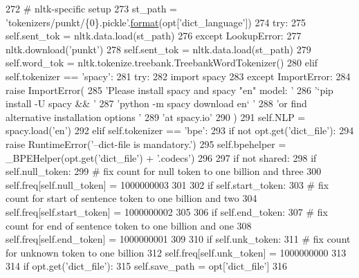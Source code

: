 \begin{DoxyCode}
272             \textcolor{comment}{# nltk-specific setup}
273             st\_path = \textcolor{stringliteral}{'tokenizers/punkt/\{0\}.pickle'}.\hyperlink{namespaceparlai_1_1chat__service_1_1services_1_1messenger_1_1shared__utils_a32e2e2022b824fbaf80c747160b52a76}{format}(opt[\textcolor{stringliteral}{'dict\_language'}])
274             \textcolor{keywordflow}{try}:
275                 self.sent\_tok = nltk.data.load(st\_path)
276             \textcolor{keywordflow}{except} LookupError:
277                 nltk.download(\textcolor{stringliteral}{'punkt'})
278                 self.sent\_tok = nltk.data.load(st\_path)
279             self.word\_tok = nltk.tokenize.treebank.TreebankWordTokenizer()
280         \textcolor{keywordflow}{elif} self.tokenizer == \textcolor{stringliteral}{'spacy'}:
281             \textcolor{keywordflow}{try}:
282                 \textcolor{keyword}{import} spacy
283             \textcolor{keywordflow}{except} ImportError:
284                 \textcolor{keywordflow}{raise} ImportError(
285                     \textcolor{stringliteral}{'Please install spacy and spacy "en" model: '}
286                     \textcolor{stringliteral}{'`pip install -U spacy && '}
287                     \textcolor{stringliteral}{'python -m spacy download en` '}
288                     \textcolor{stringliteral}{'or find alternative installation options '}
289                     \textcolor{stringliteral}{'at spacy.io'}
290                 )
291             self.NLP = spacy.load(\textcolor{stringliteral}{'en'})
292         \textcolor{keywordflow}{elif} self.tokenizer == \textcolor{stringliteral}{'bpe'}:
293             \textcolor{keywordflow}{if} \textcolor{keywordflow}{not} opt.get(\textcolor{stringliteral}{'dict\_file'}):
294                 \textcolor{keywordflow}{raise} RuntimeError(\textcolor{stringliteral}{'--dict-file is mandatory.'})
295             self.bpehelper = \_BPEHelper(opt.get(\textcolor{stringliteral}{'dict\_file'}) + \textcolor{stringliteral}{'.codecs'})
296 
297         \textcolor{keywordflow}{if} \textcolor{keywordflow}{not} shared:
298             \textcolor{keywordflow}{if} self.null\_token:
299                 \textcolor{comment}{# fix count for null token to one billion and three}
300                 self.freq[self.null\_token] = 1000000003
301 
302             \textcolor{keywordflow}{if} self.start\_token:
303                 \textcolor{comment}{# fix count for start of sentence token to one billion and two}
304                 self.freq[self.start\_token] = 1000000002
305 
306             \textcolor{keywordflow}{if} self.end\_token:
307                 \textcolor{comment}{# fix count for end of sentence token to one billion and one}
308                 self.freq[self.end\_token] = 1000000001
309 
310             \textcolor{keywordflow}{if} self.unk\_token:
311                 \textcolor{comment}{# fix count for unknown token to one billion}
312                 self.freq[self.unk\_token] = 1000000000
313 
314             \textcolor{keywordflow}{if} opt.get(\textcolor{stringliteral}{'dict\_file'}):
315                 self.save\_path = opt[\textcolor{stringliteral}{'dict\_file'}]
316 
\end{DoxyCode}



